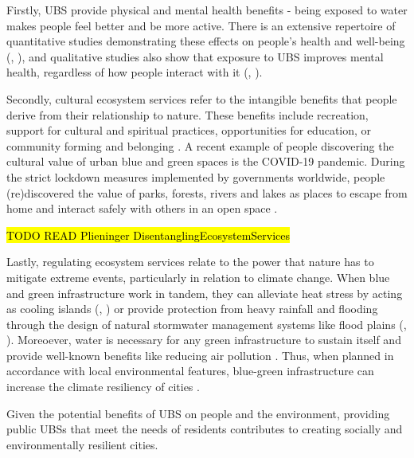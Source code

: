 \documentclass{article}
\begin{document}
Firstly, UBS provide physical and mental health benefits - being exposed to water makes people feel better and be more active. There is an extensive repertoire of quantitative studies demonstrating these effects on people's health and well-being (\cite{gascon2017outdoor}, \cite{britton2020blue}), and qualitative studies also show that exposure to UBS improves mental health, regardless of how people interact with it (\cite{garrett2019urban}, \cite{van2021urban}).

Secondly, cultural ecosystem services refer to the intangible benefits that people derive from their relationship to nature. These benefits include recreation, support for cultural and spiritual practices, opportunities for education, or community forming and belonging \parencite{phillips2021use}. A recent example of people discovering the cultural value of urban blue and green spaces is the COVID-19 pandemic. During the strict lockdown measures implemented by governments worldwide, people (re)discovered the value of parks, forests, rivers and lakes as places to escape from home and interact safely with others in an open space \parencite{kohsaka2021urban}. 

\hl{TODO READ Plieninger DisentanglingEcosystemServices}

Lastly, regulating ecosystem services relate to the power that nature has to mitigate extreme events, particularly in relation to climate change. When blue and green infrastructure work in tandem, they can alleviate heat stress by acting as cooling islands (\cite{gunawardena2017utilising}, \cite{lin2020water}) or provide protection from heavy rainfall and flooding through the design of natural stormwater management systems like flood plains (\cite{o2020sustainable}, \cite{ghofrani2017comprehensive}). Moreoever, water is necessary for  any green infrastructure to sustain itself and provide well-known benefits like reducing air pollution \parencite{pugh2012effectiveness}. Thus, when planned in accordance with local environmental features, blue-green infrastructure can increase the climate resiliency of cities \parencite{o2021international}.


Given the potential benefits of UBS on people and the environment, providing public UBSs that meet the needs of residents contributes to creating socially and environmentally resilient cities.
 
\end{document}

